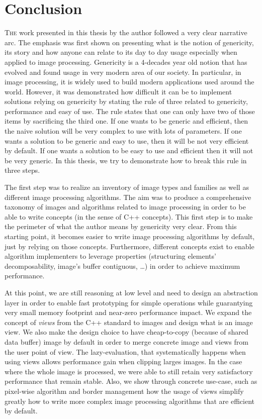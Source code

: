 \chapter{Conclusion}
\label{chap:conclusion}

\lettrine[lines=2]{T}{he} work presented in this thesis by the author followed a very clear narrative arc. The emphasis
was first shown on presenting what is the notion of genericity, its story and how anyone can relate to its day to day
usage especially when applied to image processing. Genericity is a 4-decades year old notion that has evolved and found
usage in very modern area of our society. In particular, in image processing, it is widely used to build modern
applications used around the world. However, it was demonstrated how difficult it can be to implement solutions relying
on genericity by stating the rule of three related to genericity, performance and easy of use. The rule states that one
can only have two of those items by sacrificing the third one. If one wants to be generic and efficient, then the naive
solution will be very complex to use with lots of parameters. If one wants a solution to be generic and easy to use,
then it will be not very efficient by default. If one wants a solution to be easy to use and efficient then it will not
be very generic. In this thesis, we try to demonstrate how to break this rule in three steps.

The first step was to realize an inventory of image types and families as well as different image processing algorithms.
The aim was to produce a comprehensive taxonomy of images and algorithms related to image processing in order to be able
to write concepts (in the sense of C++ concepts). This first step is to make the perimeter of what the author means by
genericity very clear. From this starting point, it becomes easier to write image processing algorithms by default, just
by relying on those concepts. Furthermore, different concepts exist to enable algorithm implementers to leverage
properties (structuring elements' decomposability, image's buffer contiguous, \ldots) in order to achieve maximum
performance.

At this point, we are still reasoning at low level and need to design an abstraction layer in order to enable fast
prototyping for simple operations while guarantying very small memory footprint and near-zero performance impact. We
expand the concept of \emph{views} from the C++ standard to images and design what is an image view. We also make the
design choice to have cheap-to-copy (because of shared data buffer) image by default in order to merge concrete image
and views from the user point of view. The lazy-evaluation, that systematically happens when using views allows
performance gain when clipping larges images. In the case where the whole image is processed, we were able to still
retain very satisfactory performance that remain stable. Also, we show through concrete use-case, such as pixel-wise
algorithm and border management how the usage of views simplify greatly how to write more complex image processing
algorithms that are efficient by default.

